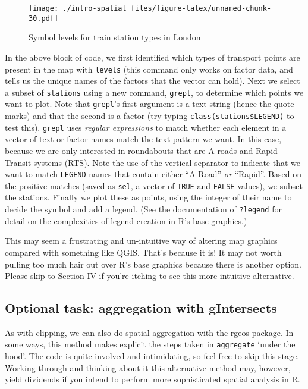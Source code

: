 \documentclass[]{article}
\begin{document}
\begin{figure}[htbp]
\centering
\texttt{[image: ./intro-spatial\_files/figure-latex/unnamed-chunk-30.pdf]}
\caption{Symbol levels for train station types in London}
\end{figure}

In the above block of code, we first identified which types of transport
points are present in the map with \texttt{levels} (this command only
works on factor data, and tells us the unique names of the factors that
the vector can hold). Next we select a subset of \texttt{stations} using
a new command, \texttt{grepl}, to determine which points we want to
plot. Note that \texttt{grepl}'s first argument is a text string (hence
the quote marks) and that the second is a factor (try typing
\texttt{class(stations\$LEGEND)} to test this). \texttt{grepl} uses
\emph{regular expressions} to match whether each element in a vector of
text or factor names match the text pattern we want. In this case,
because we are only interested in roundabouts that are A roads and Rapid
Transit systems (RTS). Note the use of the vertical separator
\texttt{\textbar{}} to indicate that we want to match \texttt{LEGEND}
names that contain either ``A Road'' \emph{or} ``Rapid''. Based on the
positive matches (saved as \texttt{sel}, a vector of \texttt{TRUE} and
\texttt{FALSE} values), we subset the stations. Finally we plot these as
points, using the integer of their name to decide the symbol and add a
legend. (See the documentation of \texttt{?legend} for detail on the
complexities of legend creation in R's base graphics.)

This may seem a frustrating and un-intuitive way of altering map
graphics compared with something like QGIS. That's because it is! It may
not worth pulling too much hair out over R's base graphics because there
is another option. Please skip to Section IV if you're itching to see
this more intuitive alternative.

\subsection{Optional task: aggregation with
gIntersects}\label{optional-task-aggregation-with-gintersects}

As with clipping, we can also do spatial aggregation with the rgeos
package. In some ways, this method makes explicit the steps taken in
\texttt{aggregate} `under the hood'. The code is quite involved and
intimidating, so feel free to skip this stage. Working through and
thinking about it this alternative method may, however, yield dividends
if you intend to perform more sophisticated spatial analysis in R.
\end{document}
